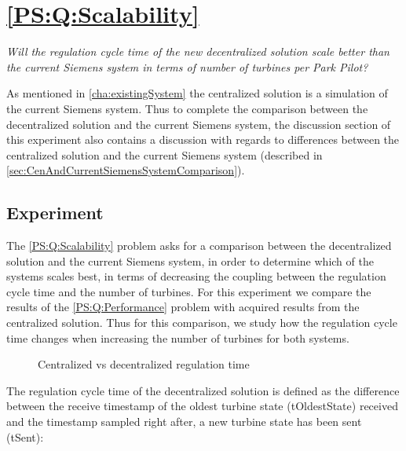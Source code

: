 \section{\ref{PS:Q:Scalability}}

\textit{Will the regulation cycle time of the new decentralized solution scale better than the current Siemens system in terms of number of turbines per Park Pilot?}\newline\newline

\noindent As mentioned in \cref{cha:existingSystem} the centralized solution is a simulation of the current Siemens system. Thus to complete the comparison between the decentralized solution and the current Siemens system, the discussion section of this experiment also contains a discussion with regards to differences between the centralized solution and the current Siemens system (described in \cref{sec:CenAndCurrentSiemensSystemComparison}).

\subsection{Experiment}
\label{subsec:Exper:Scale}

The \ref{PS:Q:Scalability} problem asks for a comparison between the decentralized solution and the current Siemens system, in order to determine which of the systems scales best, in terms of decreasing the coupling between the regulation cycle time and the number of turbines. For this experiment we compare the results of the \ref{PS:Q:Performance} problem with acquired results from the centralized solution. Thus for this comparison, we study how the regulation cycle time changes when increasing the number of turbines for both systems.


\begin{figure}[b]
	\centering
	{}
	\newline
	
	\newline
	
	{}
	
	\caption{Centralized vs decentralized regulation time}
	\label{fig:timingCentralVSDecentral}
\end{figure}

The regulation cycle time of the decentralized solution is defined as the difference between the receive timestamp of the oldest turbine state (tOldestState) received and the timestamp sampled right after, a new turbine state has been sent (tSent):

